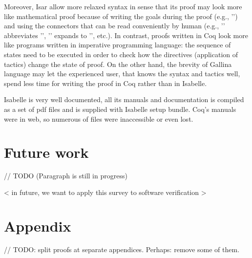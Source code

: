 \documentclass[article]{aaltoseries}
\begin{document}
Moreover, Isar allow more relaxed syntax in sense that its proof may look more like mathematical proof because of writing the goals during the proof (e.g., '') and using the connectors that can be read conveniently by human (e.g., '' abbreviates '', '' expands to '', etc.). In contrast, proofs written in Coq look more like programs written in imperative programming language: the sequence of states need to be executed in order to check how the directives (application of tactics) change the state of proof. On the other hand, the brevity of Gallina language may let the experienced user, that knows the syntax and tactics well, spend less time for writing the proof in Coq rather than in Isabelle.

Isabelle is very well documented, all its manuals and documentation is compiled as a set of pdf files and is supplied with Isabelle setup bundle. Coq's manuals were in web, so numerous of files were inaccessible or even lost.





\section{Future work}
\label{sec:future_work}

// TODO (Paragraph is still in progress)

< in future, we want to apply this survey to software verification >






\newpage
\appendix 
\section{Appendix}

// TODO: split proofs at separate appendices. Perhaps: remove some of them.

\label{appx_diff_table}
\end{document}
